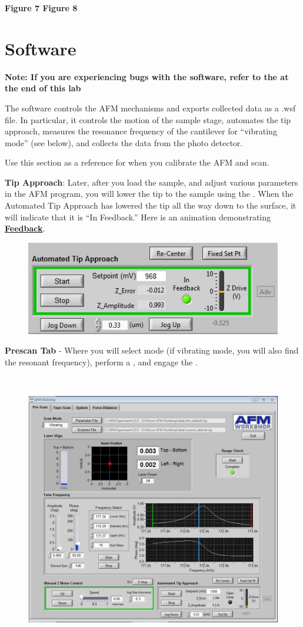\documentclass{../lab}
\begin{document}
\textbf{Figure 7                                                                                                            Figure 8}

\section{Software}

\textbf{Note: If you are experiencing bugs with the software, refer to the at the end of this lab}

The software controls the AFM mechanisms and exports collected data as a .wsf file. In particular, it controls the motion of the sample stage, automates the tip approach, measures the resonance frequency of the cantilever for ``vibrating mode'' (see below), and collects the data from the photo detector.

Use this section as a reference for when you calibrate the AFM and scan.

\textbf{Tip Approach}:  Later, after you load the sample, and adjust various parameters in the AFM program, you will lower the tip to the sample using the \textbf{}.  When the Automated Tip Approach has lowered the tip all the way down to the surface, it will indicate that it is ``In Feedback.''  Here is an animation demonstrating \href{http://experimentationlab.berkeley.edu/sites/default/files/AFMImages/4.4.\%20feedback.flv\_converted.mp4}{\textbf{Feedback}}.


\begin{figure}[h]
    \centering
    \href{http://dev-physicsadv.pantheon.berkeley.edu/sites/default/files/AFMImages/infeedback.JPG}{\includegraphics[width=0.5\linewidth]{images/infeedback.JPG}}
    \caption{}
    \label{fig:infeedback}
\end{figure}

\textbf{Prescan Tab} - Where you will select mode (if vibrating mode, you will also find the resonant frequency), perform a\textbf{ }, and engage the\textbf{ }.

​
\begin{figure}[h]
    \centering
    \href{http://dev-physicsadv.pantheon.berkeley.edu/sites/default/files/AFMImages/prescantab.JPG}{\includegraphics[width=0.5\linewidth]{images/prescantab.JPG}}
    \caption{}
    \label{fig:prescantab}
\end{figure}
\end{document}
